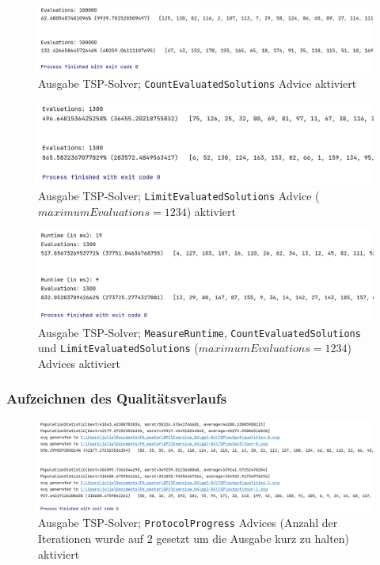 \documentclass[german,notitlepage,smartquotes]{hgbreport}
\begin{document}
\begin{figure}[h]
\centering
\includegraphics[width=.9\textwidth]{tsp-test-02}
\caption{Ausgabe TSP-Solver; \texttt{CountEvaluatedSolutions} Advice aktiviert}
\label{tsp-test-02}
\end{figure}

\begin{figure}[h]
\centering
\includegraphics[width=.9\textwidth]{tsp-test-03}
\caption{Ausgabe TSP-Solver; \texttt{LimitEvaluatedSolutions} Advice ($maximumEvaluations=1234$) aktiviert}
\label{tsp-test-03}
\end{figure}

\begin{figure}[h]
\centering
\includegraphics[width=.9\textwidth]{tsp-test-04}
\caption{Ausgabe TSP-Solver; \texttt{MeasureRuntime}, \texttt{CountEvaluatedSolutions} und \texttt{LimitEvaluatedSolutions} ($maximumEvaluations=1234$) Advices aktiviert}
\label{tsp-test-04}
\end{figure}

\subsubsection{Aufzeichnen des Qualitätsverlaufs}

\begin{figure}[h]
\centering
\includegraphics[width=.9\textwidth]{tsp-test-05}
\caption{Ausgabe TSP-Solver; \texttt{ProtocolProgress} Advices (Anzahl der Iterationen wurde auf $2$ gesetzt um die Ausgabe kurz zu halten) aktiviert}
\label{tsp-test-05}
\end{figure}
\end{document}
